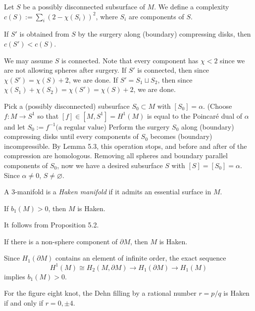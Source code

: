 \documentclass{../../small}
\begin{document}
Let $S$ be a possibly disconnected subsurface of $M$.
We define a complexity $c(S):=\sum_i(2-\chi(S_i))^2$, where $S_i$ are components of $S$.

\begin{lem}
If $S'$ is obtained from $S$ by the surgery along (boundary) compressing disks, then $c(S')<c(S)$.
\end{lem}
\begin{pf}
We may assume $S$ is connected.
Note that every component has $\chi<2$ since we are not allowing spheres after surgery.
If $S'$ is connected, then since $\chi(S')=\chi(S)+2$, we are done.
If $S'=S_1\sqcup S_2$, then since $\chi(S_1)+\chi(S_2)=\chi(S')=\chi(S)+2$, we are done.
\end{pf}

\begin{pf}
Pick a (possibly disconnected) subsurface $S_0\subset M$ with $[S_0]=\alpha$.
(Choose $f:M\to S^1$ so that $[f]\in[M,S^1]=H^1(M)$ is equal to the Poincar\'e dual of $\alpha$ and let $S_0:=f^{-1}(\text{a regular value}$)
Perform the surgery $S_0$ along (boundary) compressing disks until every components of $S_0$ becomes (boundary) incompressible.
By Lemma 5.3, this operation stops, and before and after of the compression are homologous.
Removing all spheres and boundary parallel components of $S_0$, now we have a desired subsurface $S$ with $[S]=[S_0]=\alpha$.
Since $\alpha\ne0$, $S\ne\varnothing$.
\end{pf}


A 3-manifold is a \emph{Haken manifold} if it admits an essential surface in $M$.

\begin{cor}
If $b_1(M)>0$, then $M$ is Haken.
\end{cor}
\begin{pf}
It follows from Proposition 5.2.
\end{pf}
\begin{cor}
If there is a non-sphere component of $\partial M$, then $M$ is Haken.
\end{cor}
\begin{pf}
Since $H_1(\partial M)$ contains an element of infinite order, the exact sequence
\[H^1(M)\cong H_2(M,\partial M)\to H_1(\partial M)\to H_1(M)\]
implies $b_1(M)>0$.
\end{pf}


\begin{thm}[Thurston]
For the figure eight knot, the Dehn filling by a rational number $r=p/q$ is Haken if and only if $r=0,\pm4$.
\end{thm}
\end{document}
